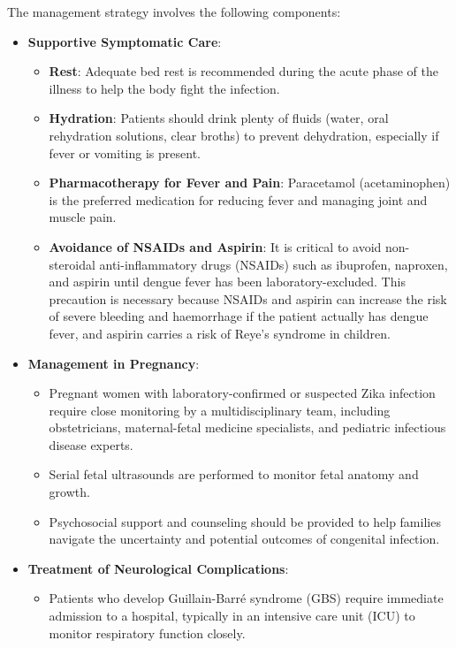 The management strategy involves the following components:
\begin{itemize}
    \item \textbf{Supportive Symptomatic Care}:
    \begin{itemize}
        \item \textbf{Rest}: Adequate bed rest is recommended during the acute phase of the illness to help the body fight the infection.
        \item \textbf{Hydration}: Patients should drink plenty of fluids (water, oral rehydration solutions, clear broths) to prevent dehydration, especially if fever or vomiting is present.
        \item \textbf{Pharmacotherapy for Fever and Pain}: Paracetamol (acetaminophen) is the preferred medication for reducing fever and managing joint and muscle pain.
        \item \textbf{Avoidance of NSAIDs and Aspirin}: It is critical to avoid non-steroidal anti-inflammatory drugs (NSAIDs) such as ibuprofen, naproxen, and aspirin until dengue fever has been laboratory-excluded. This precaution is necessary because NSAIDs and aspirin can increase the risk of severe bleeding and haemorrhage if the patient actually has dengue fever, and aspirin carries a risk of Reye's syndrome in children.
    \end{itemize}
    \item \textbf{Management in Pregnancy}:
    \begin{itemize}
        \item Pregnant women with laboratory-confirmed or suspected Zika infection require close monitoring by a multidisciplinary team, including obstetricians, maternal-fetal medicine specialists, and pediatric infectious disease experts.
        \item Serial fetal ultrasounds are performed to monitor fetal anatomy and growth.
        \item Psychosocial support and counseling should be provided to help families navigate the uncertainty and potential outcomes of congenital infection.
    \end{itemize}
    \item \textbf{Treatment of Neurological Complications}:
    \begin{itemize}
        \item Patients who develop Guillain-Barr\'e syndrome (GBS) require immediate admission to a hospital, typically in an intensive care unit (ICU) to monitor respiratory function closely.

\end{itemize}
\end{itemize}

